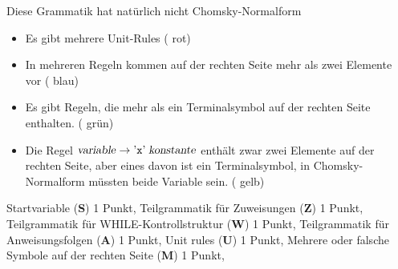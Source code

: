 \begin{loesung}
Diese Grammatik hat natürlich nicht Chomsky-Normalform
\begin{itemize}
\item Es gibt mehrere Unit-Rules
({\color{red} rot})
\item In mehreren Regeln kommen auf der rechten Seite mehr als
zwei Elemente vor
({\color{blue} blau})
\item Es gibt Regeln, die mehr als ein Terminalsymbol auf der rechten
Seite enthalten.
({\color{green} grün})
\item Die Regel
$\text{\textsl{variable}}\to \text{'{\tt x}'}\;\text{\textsl{konstante}}$
enthält zwar zwei Elemente auf der rechten Seite, aber eines davon
ist ein Terminalsymbol, in Chomsky-Normalform müssten beide Variable
sein.
({\color{yellow} gelb})
\qedhere
\end{itemize}
\end{loesung}

\begin{bewertung}
Startvariable ({\bf S}) 1 Punkt,
Teilgrammatik für Zuweisungen ({\bf Z}) 1 Punkt,
Teilgrammatik für WHILE-Kontrollstruktur ({\bf W}) 1 Punkt,
Teilgrammatik für Anweisungsfolgen ({\bf A}) 1 Punkt,
Unit rules ({\bf U}) 1 Punkt,
Mehrere oder falsche Symbole auf der rechten Seite ({\bf M}) 1 Punkt,
\end{bewertung}
